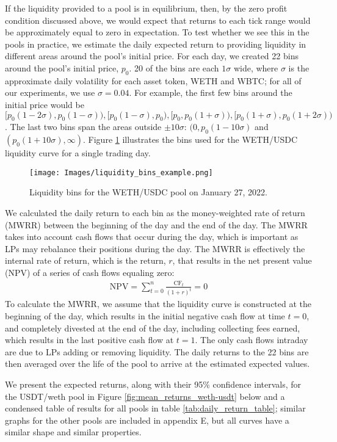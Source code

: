 \documentclass[11pt]{article}
\begin{document}
If the liquidity provided to a pool is in equilibrium, then, by the zero profit condition discussed above, we would expect that returns to each tick range would be approximately equal to zero in expectation. To test whether we see this in the pools in practice, we estimate the daily expected return to providing liquidity in different areas around the pool's initial price. For each day, we created 22 bins around the pool's initial price, $p_0$. 20 of the bins are each $1\sigma$ wide, where $\sigma$ is the approximate daily volatility for each asset token, WETH and WBTC; for all of our experiments, we use $\sigma=0.04$. For example, the first few bins around the initial price would be $[p_0(1 - 2\sigma), p_0(1 - \sigma)), [p_0(1 - \sigma), p_0), [p_0, p_0(1 + \sigma)), [p_0(1 + \sigma), p_0(1 + 2\sigma))$. The last two bins span the areas outside $\pm 10\sigma$: $(0, p_0(1 - 10\sigma)$ and $(p_0(1 + 10\sigma), \infty)$. Figure \ref{fig:liquidity_bins} illustrates the bins used for the WETH/USDC liquidity curve for a single trading day.

\begin{figure}[H]
    \centering
    \texttt{[image: Images/liquidity\_bins\_example.png]}
    \caption{Liquidity bins for the WETH/USDC pool on January 27, 2022.}
    \label{fig:liquidity_bins}
\end{figure}

We calculated the daily return to each bin as the money-weighted rate of return (MWRR) between the beginning of the day and the end of the day. The MWRR takes into account cash flows that occur during the day, which is important as LPs may rebalance their positions during the day. The MWRR is effectively the internal rate of return, which is the return, $r$, that results in the net present value (NPV) of a series of cash flows equaling zero:
\begin{gather*}
    \text{NPV} = \sum_{t=0}^{n} \frac{\text{CF}_t}{(1 + r)^t} = 0
\end{gather*}
To calculate the MWRR, we assume that the liquidity curve is constructed at the beginning of the day, which results in the initial negative cash flow at time $t=0$, and completely divested at the end of the day, including collecting fees earned, which results in the last positive cash flow at $t=1$. The only cash flows intraday are due to LPs adding or removing liquidity. The daily returns to the 22 bins are then averaged over the life of the pool to arrive at the estimated expected values.

We present the expected returns, along with their 95\% confidence intervals, for the USDT/\gls{weth} pool in Figure \ref{fig:mean_returns_weth-usdt} below and a condensed table of results for all pools in table \ref{tab:daily_return_table}; similar graphs for the other pools are included in appendix E, but all curves have a similar shape and similar properties.
\end{document}
